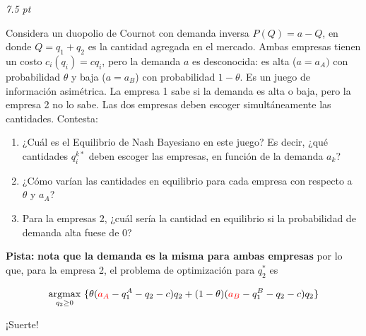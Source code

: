 \documentclass[12pt]{scrartcl} %
\begin{document}
  \begin{Exercise}[title={Duopolio de Cournot con información asimétrica}, name={Pregunta}]
    \textit{7.5 pt}

    Considera un duopolio de Cournot con demanda inversa $P(Q) = a - Q$, en donde $Q = q_1 + q_2$ es la cantidad agregada en el mercado. Ambas empresas tienen un costo $c_i(q_i) = cq_i$, pero la demanda $a$ es desconocida: es alta ($a = a_A)$ con probabilidad $\theta$ y baja ($a=a_B$) con probabilidad $1-\theta$. Es un juego de información asimétrica. La empresa 1 sabe si la demanda es alta o baja, pero la empresa 2 no lo sabe. Las dos empresas deben escoger simultáneamente las cantidades. Contesta:
    
    \begin{enumerate}
        \item ¿Cuál es el Equilibrio de Nash Bayesiano en este juego? Es decir, ¿qué cantidades $q_i^{k*}$ deben escoger las empresas, en función de la demanda $a_k$?
        \item ¿Cómo varían las cantidades en equilibrio para cada empresa con respecto a $ \theta \text{ y } a_A$?
        \item Para la empresas 2, ¿cuál sería la cantidad en equilibrio si la probabilidad de demanda alta fuese de 0?
    \end{enumerate}
    
    \textbf{Pista:} \textbf{\color{cadet} nota que la demanda es la misma para ambas empresas} por lo que, para la empresa 2, el problema de optimización para $q_2^*$ es 
    
    $$
    \operatorname*{argmax}_{q_2 \geq 0} ~ \{ \theta({\color{red}a_A} - q_1^{A} - q_2 - c)q_2 + (1 - \theta)({\color{red}a_B}- q_1^{B}-q_2-c)q_2 \}
    $$
    
    \end{Exercise}

  \begin{center}
    ¡Suerte! 
    
    \LARGE\Cat[1.2] 
  \end{center}
\end{document}
